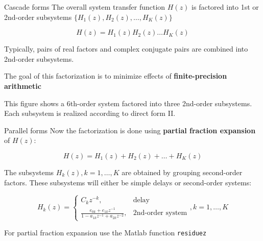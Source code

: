 \documentclass[10pt]{beamer}
\begin{document}
\begin{frame}{Cascade forms}
	The overall system transfer function  $H(z)$ is factored into 1st or 2nd-order subsystems $\{H_1(z),H_2(z),\ldots, H_K(z)\}$
	
	\begin{equation*}
	H(z) = H_1(z)H_2(z)\ldots H_K(z)
	\end{equation*}
	
	Typically, pairs of real factors and complex conjugate pairs are combined into 2nd-order subsystems.
	
	The goal of this factorization is to minimize effects of \textbf{finite-precision arithmetic}
	
\begin{center}
\end{center}

This figure shows a 6th-order system factored into three 2nd-order subsystems. Each subsystem is realized according to direct form II.
\end{frame}

\begin{frame}{Parallel forms}
	Now the factorization is done using \textbf{partial fraction expansion} of $H(z)$:
	
	\begin{equation*}
	H(z) = H_1(z) + H_2(z) + \ldots + H_K(z)
	\end{equation*}
	
	The subsystems $H_k(z), k = 1, \ldots, K$ are obtained by grouping second-order factors. These subsystems will either be simple delays or second-order systems:
	
	\begin{equation*}
	H_k(z) = \begin{cases}
	C_kz^{-k}, & \text{delay} \\
	\displaystyle\frac{e_{0k} + e_{1k}z^{-1}}{1 - a_{1k}z^{-1} + a_{2k}z^{-2}}, & \text{2nd-order system}
	\end{cases}, k = 1,\ldots, K
	\end{equation*}
	
	For partial fraction expansion use the Matlab function \texttt{residuez}
\end{frame}
\end{document}
